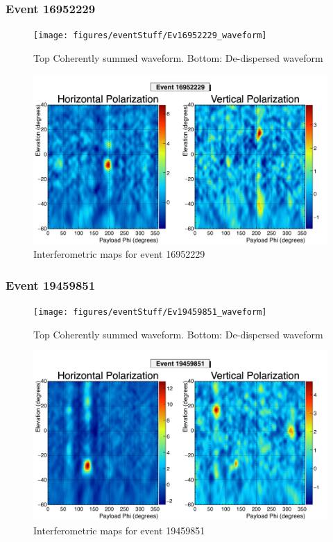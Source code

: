 		\subsubsection{Event 16952229}
		\begin{figure}
		\centering
			\texttt{[image: figures/eventStuff/Ev16952229\_waveform]}
			\caption{Top Coherently summed waveform.  Bottom: De-dispersed waveform} 
		\label{fig:Ev16952229_waveform}
		\end{figure}
		
		\begin{figure}
		\centering
			\includegraphics[width=\textwidth]{figures/intMap/intMap_ev16952229}
			\caption{Interferometric maps for event 16952229} 
		\label{fig:Ev16952229_map}
		\end{figure}			
	
		\subsubsection{Event 19459851}
		\begin{figure}
		\centering
			\texttt{[image: figures/eventStuff/Ev19459851\_waveform]}
			\caption{Top Coherently summed waveform.  Bottom: De-dispersed waveform} 
		\label{fig:Ev19459851_waveform}
		\end{figure}
		
		\begin{figure}
		\centering
			\includegraphics[width=\textwidth]{figures/intMap/intMap_ev19459851}
			\caption{Interferometric maps for event 19459851} 
		\label{fig:Ev19459851_map}
		\end{figure}	
	
